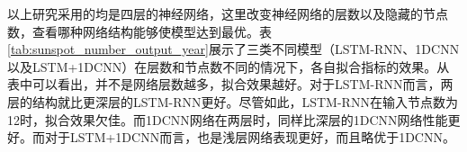 
以上研究采用的均是四层的神经网络，这里改变神经网络的层数以及隐藏的节点数，查看哪种网络结构能够使模型达到最优。表\ref{tab:sunspot_number_output_year}展示了三类不同模型（LSTM-RNN、1DCNN以及LSTM+1DCNN）在层数和节点数不同的情况下，各自拟合指标的效果。从表中可以看出，并不是网络层数越多，拟合效果越好。对于LSTM-RNN而言，两层的结构就比更深层的LSTM-RNN更好。尽管如此，LSTM-RNN在输入节点数为12时，拟合效果欠佳。而1DCNN网络在两层时，同样比深层的1DCNN网络性能更好。而对于LSTM+1DCNN而言，也是浅层网络表现更好，而且略优于1DCNN。

